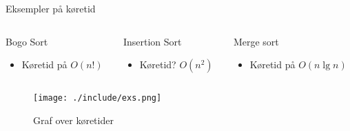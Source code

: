 \documentclass[12pt,t]{beamer}
\begin{document}
    \begin{frame}[t]{Eksempler på køretid}
        \vspace{-2em}
        \begin{columns}
            \begin{column}{0.33\textwidth}
                \begin{block}{Bogo Sort}
                    \begin{itemize}
                        \item Køretid på $O(n!)$
                    \end{itemize}
                \end{block}
            \end{column}
            \begin{column}{0.33\textwidth}
                \begin{block}{Insertion Sort}
                    \begin{itemize}
                        \item Køretid? $O(n^2)$
                    \end{itemize}
                \end{block}
            \end{column}

            \begin{column}{0.33\textwidth}
                \begin{block}{Merge sort}
                    \begin{itemize}
                        \item Køretid på $O(n \lg n)$
                    \end{itemize}
                \end{block}
            \end{column}
        \end{columns}
        \begin{figure}[h!]
            \caption{Graf over køretider}
            \centering
            \texttt{[image: ./include/exs.png]}
        \end{figure}
    \end{frame}

\end{document}
